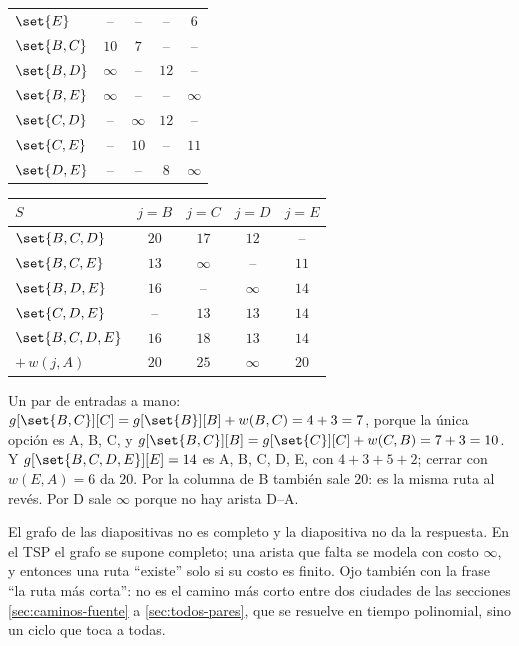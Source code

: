\documentclass[11pt,letterpaper]{article}
\begin{document}
\begin{ejemplo}
\begin{center}
\begin{tabular}[t]{lcccc}
    $\set{E}$ & -- & -- & -- & $6$ \\
    \addlinespace
    $\set{B, C}$ & $10$ & $7$ & -- & -- \\
    $\set{B, D}$ & $\infty$ & -- & $12$ & -- \\
    $\set{B, E}$ & $\infty$ & -- & -- & $\infty$ \\
    $\set{C, D}$ & -- & $\infty$ & $12$ & -- \\
    $\set{C, E}$ & -- & $10$ & -- & $11$ \\
    $\set{D, E}$ & -- & -- & $8$ & $\infty$ \\
    \bottomrule
  \end{tabular}
  \qquad
  \begin{tabular}[t]{lcccc}
    \toprule
    $S$ & $j = B$ & $j = C$ & $j = D$ & $j = E$ \\
    \midrule
    $\set{B, C, D}$ & $20$ & $17$ & $12$ & -- \\
    $\set{B, C, E}$ & $13$ & $\infty$ & -- & $11$ \\
    $\set{B, D, E}$ & $16$ & -- & $\infty$ & $14$ \\
    $\set{C, D, E}$ & -- & $13$ & $13$ & $14$ \\
    \addlinespace
    $\set{B, C, D, E}$ & $16$ & $18$ & $13$ & $14$ \\
    \midrule
    $+\,w(j, A)$ & $20$ & $25$ & $\infty$ & $20$ \\
    \bottomrule
  \end{tabular}
  \end{center}
  Un par de entradas a mano: $g[\set{B, C}][C] = g[\set{B}][B] +
  w(B, C) = 4 + 3 = 7$, porque la única opción es A, B, C, y
  $g[\set{B, C}][B] = g[\set{C}][C] + w(C, B) = 7 + 3 = 10$. Y
  $g[\set{B, C, D, E}][E] = 14$ es
  A, B, C, D, E, con $4 + 3 + 5 + 2$; cerrar con $w(E, A) = 6$ da
  $20$. Por la columna de B también sale $20$: es la misma ruta al
  revés. Por D sale $\infty$ porque no hay arista D--A.
\end{ejemplo}

\begin{ojo}
  El grafo de las diapositivas no es completo y la diapositiva no da
  la respuesta. En el TSP el grafo se supone completo; una arista que
  falta se modela con costo $\infty$, y entonces una ruta ``existe''
  solo si su costo es finito. Ojo también con la frase ``la ruta más
  corta'': no es el camino más corto entre dos ciudades de las
  secciones \ref{sec:caminos-fuente} a \ref{sec:todos-pares}, que se
  resuelve en tiempo polinomial, sino un ciclo que toca a todas.
\end{ojo}
\end{document}
